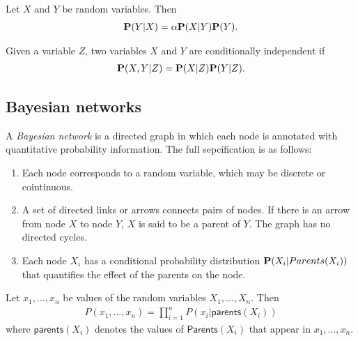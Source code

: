 \documentclass{article}
\begin{document}
\begin{theorem}
    Let $X$ and $Y$ be random variables. Then
    \begin{align*}
        \P(Y|X) = \alpha \P(X|Y)\P(Y).
    \end{align*}
\end{theorem}

\begin{definition}[R\&N p. 498]
    Given a variable $Z$, two variables $X$ and $Y$ are conditionally independent
    if
    \begin{align*}
        \P(X,Y|Z) = \P(X|Z)\P(Y|Z).
    \end{align*}
\end{definition}

\subsection{Bayesian networks}

\begin{definition}[R\&N p. 511]
    A \emph{Bayesian network} is a directed graph in which each node is
    annotated with quantitative probability information. The full sepcification
    is as follows:
    \begin{enumerate}
        \item Each node corresponds to a random variable, which may be discrete or cointinuous.
        \item A set of directed links or arrows connects pairs of nodes. If there is an arrow
        from node $X$ to node $Y$, $X$ is said to be a parent of $Y$. The graph has no directed cycles.
        \item Each node $X_i$ has a conditional probability distribution $\P(X_i|Parents(X_i))$ that 
         quantifies the effect of the parents on the node.
    \end{enumerate}
\end{definition}

\begin{proposition}[R\&N p. 513]
    Let $x_1, ..., x_n$ be values of the random variables $X_1,...,X_n$. Then 
    \begin{align*}
        P(x_1, ..., x_n) = \prod_{i=1}^n P(x_i | \textsf{parents}(X_i))
    \end{align*}
    where $\textsf{parents}(X_i)$ denotes the values of $\textsf{Parents}(X_i)$ that
    appear in $x_1, ..., x_n$.
\end{proposition}
\end{document}

